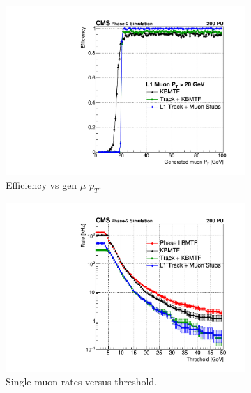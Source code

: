 \begin{figure} [htb!]
	\centering
	\captionsetup[subfigure]{justification=centering}
	\begin{subfigure}[h]{0.45\linewidth}
		\centering
		\includegraphics[width=\linewidth]{figs/04_muons/effVsPt_20_TPS.pdf}
		\caption{Efficiency vs gen $\mu$ $p_T$.}
		\label{}
	\end{subfigure} \hspace{0.05\linewidth}
	\begin{subfigure}[h]{0.45\linewidth}
		\centering
		\includegraphics[width=\linewidth]{figs/04_muons/rateVsPt_TPS.pdf}
		\caption{Single muon rates versus threshold.}
		\label{}
	\end{subfigure}
	\begin{subfigure}[h]{0.45\linewidth}
		\centering

\end{subfigure}
\end{figure}
